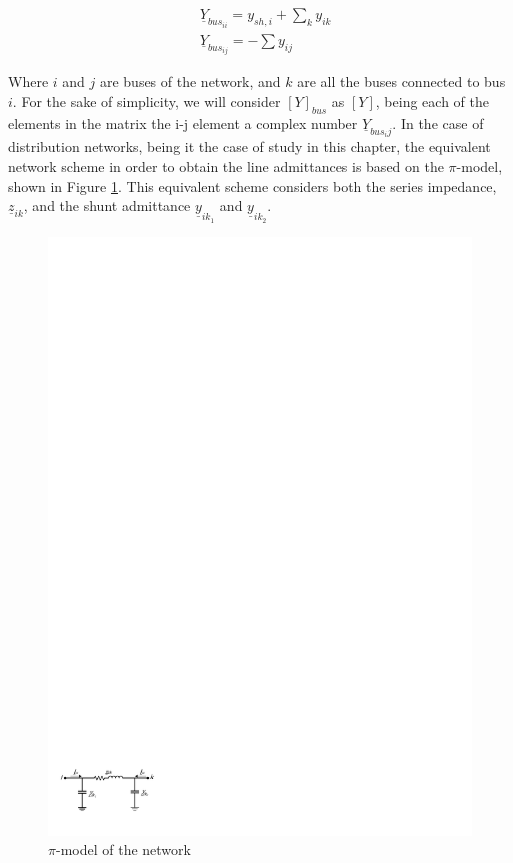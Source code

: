 \begin{subequations}
\begin{align*}
& \underline{Y}_{bus_{ii}}= y_{sh,i} + \sum_k y_{ik} \\
& \underline{Y}_{bus_{ij}} = - \sum y_{ij}
\end{align*}
\end{subequations}

Where $i$ and $j$ are buses of the network, and $k$ are all the buses connected to bus $i$. For the sake of simplicity, we will consider $[Y]_{bus}$ as $[Y]$, being each of the elements in the matrix the i-j element a complex number $\underline{Y}_{bus_ij}$. In the case of distribution networks, being it the case of study in this chapter, the equivalent network scheme in order to obtain the line admittances is based on the $\pi$-model, shown in Figure \ref{fig:pimodel}. This equivalent scheme considers both the series impedance, $\underline{z}_{ik}$, and the shunt admittance $\underline{y}_{ik_1}$ and $\underline{y}_{ik_2}$.

\begin{figure}[htbp]
	\centering
	\includegraphics[width=0.7\columnwidth ]{ChapterOPF_DSO/Figures/pimodel2.pdf}
		\caption{$\pi$-model of the network}
	\label{fig:pimodel}  
\end{figure}

